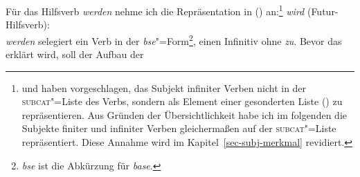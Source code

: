 Für das Hilfsverb \emph{werden} nehme ich die Repräsentation in () an:\footnote{\label{subj-fn}%
        \citet{Pollard90a} und \citet*{Kiss92} haben vorgeschlagen, das Subjekt infiniter
Verben nicht in der \textsc{subcat}"=Liste des Verbs, sondern als Element einer gesonderten Liste (\subj)
zu repräsentieren. Aus Gründen der Übersichtlichkeit habe ich im folgenden die Subjekte finiter
und infiniter Verben gleichermaßen auf der \textsc{subcat}"=Liste repräsentiert. Diese Annahme
wird im Kapitel~\ref{sec-subj-merkmal} revidiert.%
}
\eas
\label{le-wird}
\textit{wird\/} (Futur-Hilfsverb):\\
\zs
\emph{werden} selegiert ein Verb in der \textit{bse\/}"=Form\footnote{%
  \emph{bse} ist die Abkürzung für \emph{base}.%
}, \dash einen Infinitiv ohne \emph{zu}. Bevor das \lexm erklärt wird, soll der Aufbau der \subcatl
